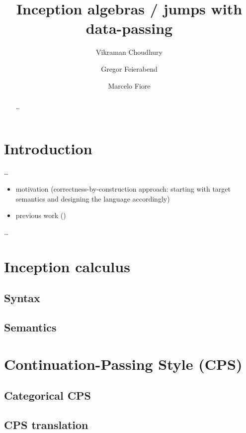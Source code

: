 \documentclass[a4paper,UKenglish,cleveref,thm-restate]{lipics-v2021}
\title{Inception algebras / jumps with data-passing} %
\author%
{Vikraman Choudhury}%
{University of Strathclyde, Glasgow, United Kingdom}%
{vikraman.choudhury@strath.ac.uk}%
{https://orcid.org/0000-0003-2030-8056}%
{Supported by ...}%
\author%
{Gregor Feierabend}%
{University of Cambridge, Cambridge, United Kingdom}%
{gregor.feierabend@cst.cam.ac.uk}%
{...}%
{Supported by ...}%
\author%
{Marcelo Fiore}%
{University of Cambridge, Cambridge, United Kingdom}%
{marcelo.fiore@cst.cam.ac.uk}%
{...}%
{Supported by ...}%
\begin{document}
\maketitle

\begin{abstract}
  \dots
\end{abstract}

\section{Introduction}
\dots
\begin{itemize}
  \item motivation (correctness-by-construction approach: starting with target semantics and designing the language accordingly)
  \item previous work (\cite{choudhuryDualityLAbstraction2025,fioreSubstitutionJumpsAlgebraic2014})
\end{itemize}
\dots

\clearpage
\section{Inception calculus}

\subsection{Syntax}



\subsection{Semantics}




\section{Continuation-Passing Style (CPS)}

\subsection{Categorical CPS}



\subsection{CPS translation}
\end{document}
